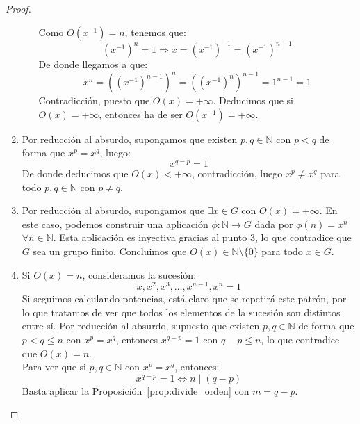 \begin{prop}
\begin{proof}
\begin{enumerate}
\begin{itemize}
                        Como $O(x^{-1})=n$, tenemos que:
                        \begin{equation*}
                            {\left(x^{-1}\right)}^{n} = 1 \Longrightarrow x = {\left(x^{-1}\right)}^{-1} = {\left(x^{-1}\right)}^{n-1}
                        \end{equation*}
                        De donde llegamos a que:
                        \begin{equation*}
                            x^n = {\left({\left(x^{-1}\right)}^{n-1}\right)}^{n} = {\left({\left(x^{-1}\right)}^{n}\right)}^{n-1} = 1^{n-1} = 1
                        \end{equation*}
                        Contradicción, puesto que $O(x)=+\infty$. Deducimos que si $O(x)=+\infty$, entonces ha de ser $O(x^{-1})=+\infty$. 
                \end{itemize}
            \item Por reducción al absurdo, supongamos que existen $p,q\in \mathbb{N}$ con $p< q$ de forma que $x^p = x^q$, luego:
                \begin{equation*}
                    x^{q-p} = 1
                \end{equation*}
                De donde deducimos que $O(x)<+\infty$, contradicción, luego $x^p \neq x^q$ para todo $p,q\in \mathbb{N}$ con $p\neq q$.
            \item Por reducción al absurdo, supongamos que $\exists x\in G$ con $O(x) = +\infty$. En este caso, podemos construir una aplicación $\phi:\mathbb{N}\to G$ dada por $\phi(n) = x^n$ $\forall n\in \mathbb{N}$. Esta aplicación es inyectiva gracias al punto 3, lo que contradice que $G$ sea un grupo finito. Concluimos que $O(x) \in \mathbb{N}\setminus\{0\}$ para todo $x\in G$.
            \item Si $O(x)=n$, consideramos la sucesión:
                \begin{equation*}
                    x, x^2, x^3, \ldots, x^{n-1}, x^n = 1
                \end{equation*}
                Si seguimos calculando potencias, está claro que se repetirá este patrón, por lo que tratamos de ver que todos los elementos de la sucesión son distintos entre sí. Por reducción al absurdo, supuesto que existen $p,q\in \mathbb{N}$ de forma que $p<q\leq n$ con $x^p = x^q$, entonces $x^{q-p} = 1$ con $q-p \leq n$, lo que contradice que $O(x) = n$.\\

                Para ver que si $p,q\in \mathbb{N}$ con $x^p = x^q$, entonces:
                \begin{equation*}
                    x^{q-p} = 1 \Longleftrightarrow n\mid (q-p)
                \end{equation*}
                Basta aplicar la Proposición~\ref{prop:divide_orden} con $m=q-p$.
        \end{enumerate}
    \end{proof}
\end{prop}

